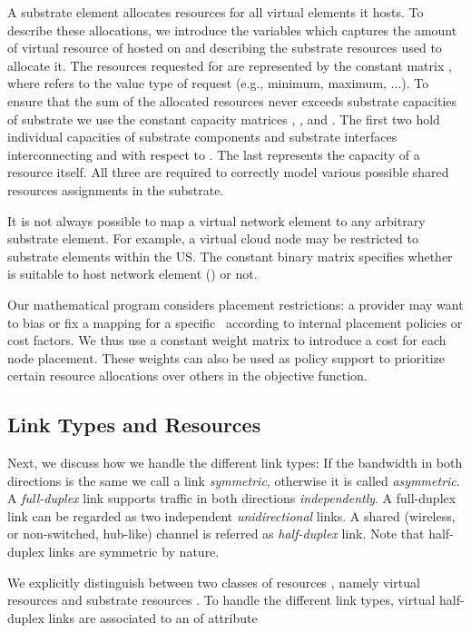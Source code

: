 \documentclass[conference,10pt]{IEEEtran}
\newcommand{\CloudNet}{\text{CloudNet}}
\begin{document}
A substrate element allocates resources for all virtual elements it
hosts. To describe these allocations, we introduce the variables
 which captures the amount of virtual resource  of  hosted on  and
 describing
the substrate resources  used to allocate it.
The resources  requested for 
are represented by the constant matrix , where  refers to the value type of request (e.g., minimum, maximum, ...).
To ensure that
the sum of the allocated resources never exceeds substrate
capacities of substrate we use the constant capacity matrices , ,
and . The first two hold individual capacities of substrate components  and substrate interfaces interconnecting  and  with respect to . The last represents the capacity of a resource  itself.
All three are required to correctly model various possible shared resources assignments in the substrate.

It is not always possible to map a virtual network element to any
arbitrary substrate element. For example, a virtual cloud node may
be restricted to substrate elements within the US. The constant
binary matrix  specifies whether  is suitable to host
network element  () or not.

Our mathematical program considers placement restrictions: a
provider may want to bias or fix a mapping for a specific \CloudNet\
according to internal placement policies or cost factors. We thus use a constant
weight matrix  to introduce a cost for each node
placement. These weights can also be used as policy support to prioritize certain
resource allocations over others in the objective function.

\subsection{Link Types and Resources} \label{ssec:map:approach:links}

Next, we discuss how we handle the different link types: If the
bandwidth in both directions is the same we call a link
\emph{symmetric}, otherwise it is called \emph{asymmetric}.  A
\emph{full-duplex} link supports traffic in both directions
\emph{independently}. A full-duplex link can be regarded as two
independent \emph{unidirectional} links. A shared (wireless, or
non-switched, hub-like) channel is referred as \emph{half-duplex}
link. Note that half-duplex links are symmetric by nature.

We explicitly distinguish between two classes
of resources , namely virtual
resources  and substrate resources
.
To handle the different link types, virtual half-duplex links are associated to an  of attribute
\end{document}

